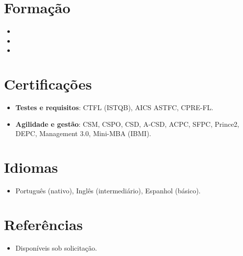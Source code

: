 \documentclass[11pt,a4paper,sans]{moderncv}
\begin{document}

\section{Formação}
\vspace{1pt}
\begin{itemize}

\item{}
\item{}
\item{}

\end{itemize}


\section{Certificações}
\vspace{1pt}
\begin{itemize}
\item \textbf{Testes e requisitos}: CTFL (ISTQB), AICS ASTFC, CPRE-FL.
\item \textbf{Agilidade e gestão}: CSM, CSPO, CSD, A-CSD, ACPC, SFPC, Prince2, DEPC, Management 3.0, Mini-MBA (IBMI).
\end{itemize}


\section{Idiomas}
\vspace{1pt}
\begin{itemize}
\item Português (nativo), Inglês (intermediário), Espanhol (básico).
\end{itemize}


\section{Referências}
\vspace{1pt}
\begin{itemize}
\item{Disponíveis sob solicitação.}
\end{itemize}
\end{document}
